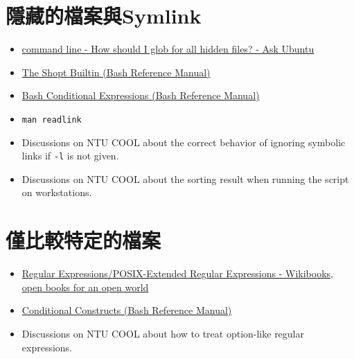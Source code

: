 \documentclass[12pt, a4paper]{article}
\begin{document}
  \section{隱藏的檔案與Symlink}
  \begin{itemize}
    \item \href{https://askubuntu.com/questions/829796/how-should-i-glob-for-all-hidden-files}{command line - How should I glob for all hidden files? - Ask Ubuntu}
    \item \href{https://www.gnu.org/software/bash/manual/html_node/The-Shopt-Builtin.html}{The Shopt Builtin (Bash Reference Manual)}
    \item \href{https://www.gnu.org/software/bash/manual/html_node/Bash-Conditional-Expressions.html}{Bash Conditional Expressions (Bash Reference Manual)}
    \item \verb|man readlink|
    \item Discussions on NTU COOL about the correct behavior of ignoring
      symbolic links if \texttt{-l} is not given.
    \item Discussions on NTU COOL about the sorting result when running the
      script on workstations.
  \end{itemize}

  \section{僅比較特定的檔案}
  \begin{itemize}
    \item \href{https://en.wikibooks.org/wiki/Regular_Expressions/POSIX-Extended_Regular_Expressions}{Regular Expressions/POSIX-Extended Regular Expressions - Wikibooks, open books for an open world}
    \item \href{https://www.gnu.org/software/bash/manual/html_node/Conditional-Constructs.html}{Conditional Constructs (Bash Reference Manual)}
    \item Discussions on NTU COOL about how to treat option-like regular
      expressions.
  \end{itemize}
\end{document}
